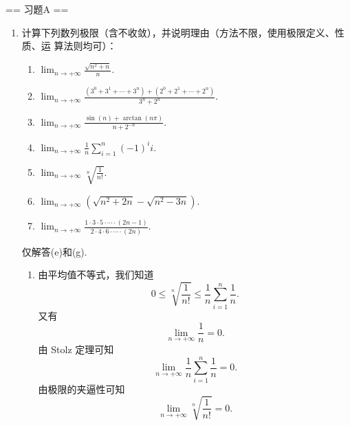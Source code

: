\newenvironment{solution}{\begin{proofc}[解答]}{\end{proofc}}

== 习题A ==
\begin{enumerate}
    \item[1.]计算下列数列极限（含不收敛），并说明理由（方法不限，使用极限定义、性质、运
    算法则均可）：
    \begin{enumerate}
        \item[(a)]$\displaystyle \lim_{n\to+\infty}\frac{\sqrt{n^2+n}}{n}.$
        \item[(b)]$\displaystyle \lim_{n\to+\infty}\frac{(3^0+3^1+\cdots+3^n)+(2^0+2^1+\cdots+2^n)}{3^n+2^n}.$
        \item[(c)]$\displaystyle \lim_{n\to+\infty}\frac{\sin{(n)}+\arctan{(n\pi)}}{n+2^{-n}}.$
        \item[(d)]$\displaystyle \lim_{n\to+\infty}\frac{1}{n}\sum_{i=1}^{n}(-1)^i i.$
        \item[(e)]$\displaystyle \lim_{n\to+\infty}\sqrt[n]{\frac{1}{n!}}.$
        \item[(f)]$\displaystyle \lim_{n\to+\infty}\left(\sqrt{n^2+2n}-\sqrt{n^2-3n}\right).$
        \item[(g)]$\displaystyle \lim_{n\to+\infty}\frac{1\cdot3\cdot5\cdot\cdots\cdot(2n-1)}{2\cdot4\cdot6\cdot\cdots\cdot(2n)}.$
    \end{enumerate}
    \begin{solution}
        仅解答(e)和(g).
        \begin{enumerate}
            \item[(e)]
            由平均值不等式，我们知道
            \[
            0\leq \sqrt[n]{\frac{1}{n!}} \leq \frac{1}{n}\sum_{i=1}^{n}\frac{1}{n}.	
            \]
            又有
            \[
            \lim_{n \to +\infty}\frac{1}{n}=0.
            \]
            由 Stolz 定理可知
            \[
            \lim_{n \to +\infty}\frac{1}{n}\sum_{i=1}^{n}\frac{1}{n}=0.
            \]
            由极限的夹逼性可知
            \[
            \lim_{n \to +\infty}\sqrt[n]{\frac{1}{n!}}=0.
\]
\end{enumerate}
\end{solution}
\end{enumerate}
